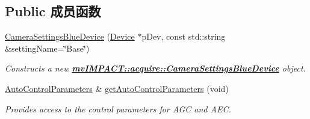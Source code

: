 \subsection*{Public 成员函数}
\begin{DoxyCompactItemize}
\item 
\hyperlink{classmv_i_m_p_a_c_t_1_1acquire_1_1_camera_settings_blue_device_a66c6f132a7574119e138887e91bd635a}{Camera\+Settings\+Blue\+Device} (\hyperlink{classmv_i_m_p_a_c_t_1_1acquire_1_1_device}{Device} $\ast$p\+Dev, const std\+::string \&setting\+Name=\char`\"{}Base\char`\"{})
\begin{DoxyCompactList}\small\item\em Constructs a new {\bfseries \hyperlink{classmv_i_m_p_a_c_t_1_1acquire_1_1_camera_settings_blue_device}{mv\+I\+M\+P\+A\+C\+T\+::acquire\+::\+Camera\+Settings\+Blue\+Device}} object. \end{DoxyCompactList}\item 
\hyperlink{classmv_i_m_p_a_c_t_1_1acquire_1_1_auto_control_parameters}{Auto\+Control\+Parameters} \& \hyperlink{classmv_i_m_p_a_c_t_1_1acquire_1_1_camera_settings_blue_device_ad0110b1e3664d2c563ae850178bc367a}{get\+Auto\+Control\+Parameters} (void)
\begin{DoxyCompactList}\small\item\em Provides access to the control parameters for A\+G\+C and A\+E\+C. \end{DoxyCompactList}\end{DoxyCompactItemize}
